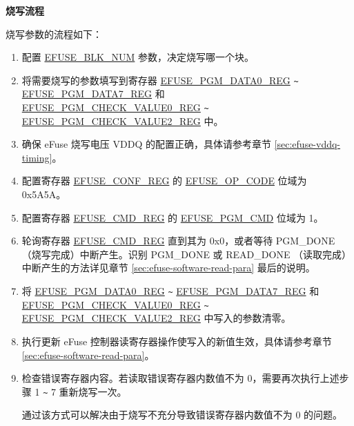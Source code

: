 \documentclass[main\_\_CN.tex]{subfiles}
\begin{document}
{\bfseries 烧写流程}

烧写参数的流程如下：
\begin{enumerate}
\item 配置 \hyperref[fielddesc:EFUSEBLKNUM]{EFUSE\_BLK\_NUM} 参数，决定烧写哪一个块。

\item 将需要烧写的参数填写到寄存器 \hyperref[regdesc:EFUSEPGMDATANREG]{EFUSE\_PGM\_DATA0\_REG} \verb+~+ \hyperref[regdesc:EFUSEPGMDATANREG]{EFUSE\_PGM\_DATA7\_REG} 和\\ \hyperref[regdesc:EFUSEPGMCHECKVALUENREG]{EFUSE\_PGM\_CHECK\_VALUE0\_REG}  \verb+~+  \hyperref[regdesc:EFUSEPGMCHECKVALUENREG]{EFUSE\_PGM\_CHECK\_VALUE2\_REG} 中。


\item 确保 eFuse 烧写电压 VDDQ 的配置正确，具体请参考章节 \ref{sec:efuse-vddq-timing}。

\item 配置寄存器 \hyperref[regdesc:EFUSECONFREG]{EFUSE\_CONF\_REG} 的 \hyperref[fielddesc:EFUSEOPCODE]{EFUSE\_OP\_CODE} 位域为 0x5A5A。

\item 配置寄存器 \hyperref[regdesc:EFUSECMDREG]{EFUSE\_CMD\_REG} 的 \hyperref[fielddesc:EFUSEPGMCMD]{EFUSE\_PGM\_CMD} 位域为 1。

\item 轮询寄存器 \hyperref[regdesc:EFUSECMDREG]{EFUSE\_CMD\_REG} 直到其为 0x0，或者等待 PGM\_DONE（烧写完成）中断产生。识别 PGM\_DONE 或 READ\_DONE （读取完成）中断产生的方法详见章节 \ref{sec:efuse-software-read-para} 最后的说明。

\item 将 \hyperref[regdesc:EFUSEPGMDATANREG]{EFUSE\_PGM\_DATA0\_REG} \verb+~+ \hyperref[regdesc:EFUSEPGMDATANREG]{EFUSE\_PGM\_DATA7\_REG} 和\\ \hyperref[regdesc:EFUSEPGMCHECKVALUENREG]{EFUSE\_PGM\_CHECK\_VALUE0\_REG}  \verb+~+  \hyperref[regdesc:EFUSEPGMCHECKVALUENREG]{EFUSE\_PGM\_CHECK\_VALUE2\_REG} 中写入的参数清零。

\item 执行更新 eFuse 控制器读寄存器操作使写入的新值生效，具体请参考章节 \ref{sec:efuse-software-read-para}。
\item 检查错误寄存器内容。若读取错误寄存器内数值不为 0，需要再次执行上述步骤 1 \verb+~+ 7 重新烧写一次。

通过该方式可以解决由于烧写不充分导致错误寄存器内数值不为 0 的问题。


\end{enumerate}
\end{document}

